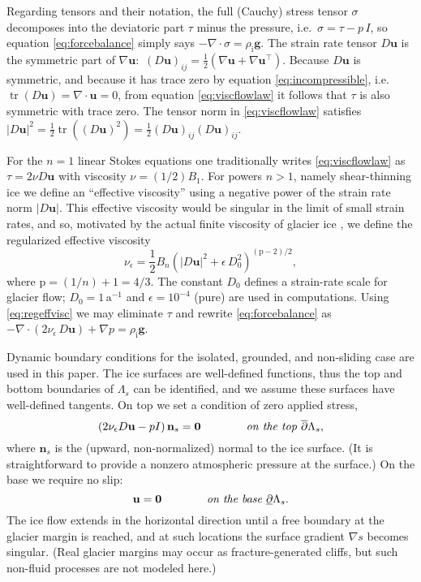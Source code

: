 \documentclass[letterpaper,final,12pt,reqno]{amsart}
\theoremstyle{claim}
\newcommand{\eps}{\epsilon}
\newcommand{\grad}{\nabla}
\newcommand{\Div}{\nabla\cdot}
\newcommand{\trace}{\operatorname{tr}}
\newcommand{\bg}{\mathbf{g}}
\newcommand{\bn}{\mathbf{n}}
\newcommand{\bu}{\mathbf{u}}
\newcommand{\bzero}{\bm{0}}
\newcommand{\rhoi}{\rho_{\text{i}}}
\newcommand{\pp}{{\text{p}}}
\numberwithin{equation}{section}
\numberwithin{figure}{section}
\numberwithin{table}{section}
\numberwithin{theorem}{section}
\begin{document}
Regarding tensors and their notation, the full (Cauchy) stress tensor $\sigma$ \cite{GreveBlatter2009} decomposes into the deviatoric part $\tau$ minus the pressure, i.e.~$\sigma = \tau - p\,I$, so equation \eqref{eq:forcebalance} simply says $-\Div \sigma = \rhoi \bg$.  The strain rate tensor $D\bu$ is the symmetric part of $\grad \bu$: \,$(D\bu)_{ij} = \frac{1}{2} \left(\grad\bu + \grad\bu^\top\right)$.  Because $D\bu$ is symmetric, and because it has trace zero by equation \eqref{eq:incompressible}, i.e.~$\trace(D\bu)=\nabla \cdot \bu = 0$, from equation \eqref{eq:viscflowlaw} it follows that $\tau$ is also symmetric with trace zero.  The tensor norm in \eqref{eq:viscflowlaw} satisfies $|D\bu|^2 = \frac{1}{2} \trace\left((D\bu)^2\right) = \frac{1}{2} (D\bu)_{ij} (D\bu)_{ij}$.

For the $n=1$ linear Stokes equations \cite{Elmanetal2014} one traditionally writes \eqref{eq:viscflowlaw} as $\tau = 2\nu D\bu$ with viscosity $\nu = (1/2) B_1$.  For powers $n>1$, namely shear-thinning ice we define an ``effective viscosity'' using a negative power of the strain rate norm $|D\bu|$.  This effective viscosity would be singular in the limit of small strain rates, and so, motivated by the actual finite viscosity of glacier ice \cite{GreveBlatter2009}, we define the regularized effective viscosity
\begin{equation}
\nu_\eps = \frac{1}{2} B_n \left(|D\bu|^2 + \eps\, D_0^2\right)^{(\pp-2)/2}, \label{eq:regeffvisc}
\end{equation}
where $\pp=(1/n)+1=4/3$.  The constant $D_0$ defines a strain-rate scale for glacier flow; $D_0 = 1 \,\text{a}^{-1}$ and $\eps = 10^{-4}$ (pure) are used in computations.  Using \eqref{eq:regeffvisc} we may eliminate $\tau$ and rewrite \eqref{eq:forcebalance} as $- \nabla \cdot \left(2 \nu_\eps\, D\bu\right) + \nabla p = \rhoi \mathbf{g}$.

Dynamic boundary conditions for the isolated, grounded, and non-sliding case are used in this paper.  The ice surfaces are well-defined functions, thus the top and bottom boundaries of $\Lambda_s$ can be identified, and we assume these surfaces have well-defined tangents.  On top we set a condition of zero applied stress,
\begin{equation}
\left(2 \nu_\eps D\bu - pI\right) \bn_s = \bzero  \qquad \qquad \text{\emph{on the top} } \overline{\partial} \Lambda_s, \label{eq:topbc}
\end{equation}
where $\bn_s$ is the (upward, non-normalized) normal to the ice surface.  (It is straightforward to provide a nonzero atmospheric pressure at the surface.)  On the base we require no slip:
\begin{equation}
\bu = \bzero  \qquad\qquad \text{\emph{on the base} } \underline{\partial} \Lambda_s. \label{eq:basebc}
\end{equation}
The ice flow extends in the horizontal direction until a free boundary at the glacier margin is reached, and at such locations the surface gradient $\grad s$ becomes singular.  (Real glacier margins may occur as fracture-generated cliffs, but such non-fluid processes are not modeled here.)
\end{document}
